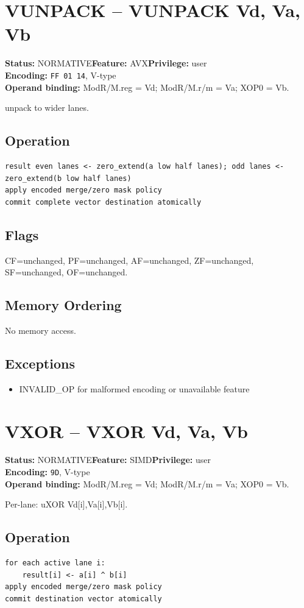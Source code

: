 \documentclass[10pt]{article}
\begin{document}
\section{VUNPACK -- VUNPACK Vd, Va, Vb}
\textbf{Status:} NORMATIVE\quad \textbf{Feature:} AVX\quad \textbf{Privilege:} user\\
\textbf{Encoding:} \texttt{FF 01 14}, V-type\\
\textbf{Operand binding:} ModR/M.reg = Vd; ModR/M.r/m = Va; XOP0 = Vb.

unpack to wider lanes.

\subsection*{Operation}
\begin{lstlisting}
result even lanes <- zero_extend(a low half lanes); odd lanes <- zero_extend(b low half lanes)
apply encoded merge/zero mask policy
commit complete vector destination atomically
\end{lstlisting}
\subsection*{Flags}
CF=unchanged, PF=unchanged, AF=unchanged, ZF=unchanged, SF=unchanged, OF=unchanged.
\subsection*{Memory Ordering}
No memory access.
\subsection*{Exceptions}
\begin{itemize}
\item INVALID\_OP for malformed encoding or unavailable feature
\end{itemize}
\clearpage

\section{VXOR -- VXOR Vd, Va, Vb}
\textbf{Status:} NORMATIVE\quad \textbf{Feature:} SIMD\quad \textbf{Privilege:} user\\
\textbf{Encoding:} \texttt{9D}, V-type\\
\textbf{Operand binding:} ModR/M.reg = Vd; ModR/M.r/m = Va; XOP0 = Vb.

Per-lane: uXOR Vd[i],Va[i],Vb[i].

\subsection*{Operation}
\begin{lstlisting}
for each active lane i:
    result[i] <- a[i] ^ b[i]
apply encoded merge/zero mask policy
commit destination vector atomically
\end{lstlisting}
\end{document}
